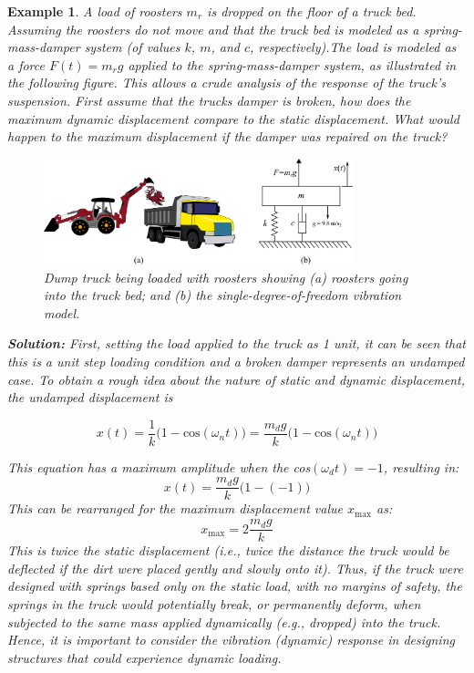 \documentclass[12pt,letter]{article}
\newtheorem{ex}{Example}
\numberwithin{ex}{section} %
\newenvironment{example}{\begin{mdframed}[middlelinewidth=0.5mm]\begin{ex}\normalfont}{\end{ex}\end{mdframed}}
\numberwithin{re}{section} %
\begin{document}
\begin{example}
A load of roosters $m_r$ is dropped on the floor of a truck bed. Assuming the roosters do not move and that the truck bed is modeled as a spring-mass-damper system (of values $k$, $m$, and $c$, respectively).The load is modeled as a force $F(t) = m_r g$ applied to the spring-mass-damper system, as illustrated
in the following figure. This allows a crude analysis of the response of the truck's suspension. First assume that the trucks damper is broken, how does the maximum dynamic displacement compare to the static displacement. What would happen to the maximum displacement if the damper was repaired on the truck? %

\begin{figure}[H]
	\centering
	\includegraphics[width=0.8\textwidth]{../Figures/dump_truck_example.png}
	\caption{Dump truck being loaded with roosters showing (a) roosters going into the truck bed; and (b) the single-degree-of-freedom vibration model.}
\end{figure}

\noindent\textbf{Solution:} First, setting the load applied to the truck as 1 unit, it can be seen that this is a unit step loading condition and a broken damper represents an undamped case. To obtain a rough idea about the nature of static and dynamic displacement, the undamped displacement is

\begin{equation}
	x(t) = \frac{1}{k}\big(1-\text{cos}(\omega_n t)\big) = \frac{m_dg}{k}\big(1-\text{cos}(\omega_n t)\big)
\end{equation}
 
This equation has a maximum amplitude when the cos$(\omega_dt)=-1$, resulting in:
\begin{equation}
	x(t) = \frac{m_dg}{k}\big(1-(-1)\big)
\end{equation}
This can be rearranged for the maximum displacement value $x_\text{max} $ as:
\begin{equation}
	x_\text{max} = 2\frac{m_dg}{k}
\end{equation} 
This is twice the static displacement (i.e., twice the distance the truck would be deflected if the dirt were placed gently and slowly onto it). Thus, if the truck were designed with springs based only on the static load, with no margins of safety, the springs in the truck
would potentially break, or permanently deform, when subjected to the same mass applied dynamically (e.g., dropped) into the truck. Hence, it is important to consider the vibration (dynamic) response in designing structures that could experience dynamic loading.


\end{example}
\end{document}
